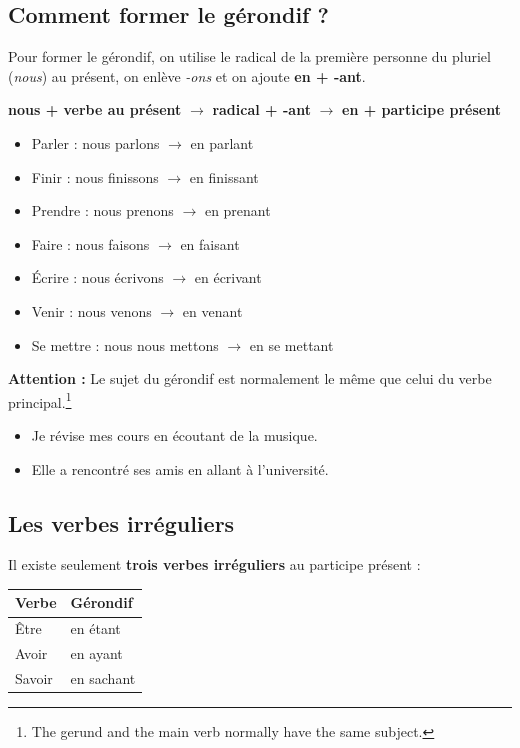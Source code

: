 \documentclass[math,code]{amznotes}
\theoremstyle{remark}
\begin{document}
\subsection*{Comment former le gérondif ?}

Pour former le gérondif, on utilise le radical de la première personne du pluriel (\textit{nous}) au présent, on enlève \textit{-ons} et on ajoute \textbf{en + -ant}.

\begin{center}
    \textbf{nous + verbe au présent}
    $\longrightarrow$ \textbf{radical + -ant}
    $\longrightarrow$ \textbf{en + participe présent}
\end{center}

\begin{itemize}
    \item Parler : nous parlons $\rightarrow$ en parlant
    \item Finir : nous finissons $\rightarrow$ en finissant
    \item Prendre : nous prenons $\rightarrow$ en prenant
    \item Faire : nous faisons $\rightarrow$ en faisant
    \item Écrire : nous écrivons $\rightarrow$ en écrivant
    \item Venir : nous venons $\rightarrow$ en venant
    \item Se mettre : nous nous mettons $\rightarrow$ en se mettant
\end{itemize}

\begin{notebox}
    \textbf{Attention :} Le sujet du gérondif est normalement le même que celui du verbe principal.\footnote{The gerund and the main verb normally have the same subject.}
    \begin{itemize}
        \item Je révise mes cours en écoutant de la musique.
        \item Elle a rencontré ses amis en allant à l'université.
    \end{itemize}
\end{notebox}

\subsection*{Les verbes irréguliers}

Il existe seulement \textbf{trois verbes irréguliers} au participe présent :

\begin{center}
\begin{tabular}{ll}
    \hline
    \textbf{Verbe} & \textbf{Gérondif} \\
    \hline
    Être & en étant \\
    Avoir & en ayant \\
    Savoir & en sachant \\
    \hline
\end{tabular}
\end{center}
\end{document}
